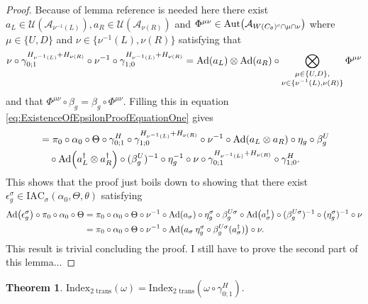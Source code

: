 \documentclass[12pt,a4paper,twoside]{article}
\newcommand{\IAC}{\textrm{IAC}}
\let\originalleft\left
\let\originalright\right
\renewcommand{\left}{\mathopen{}\mathclose\bgroup\originalleft}
\renewcommand{\right}{\aftergroup\egroup\originalright}
\newcommand{\UU}{\mathcal U}
\renewcommand{\AA}{\mathcal A}
\newcommand{\Ad}[1]{\textrm{Ad}\left(#1\right)}
\newcommand{\Aut}[1]{\textrm{Aut}\left(#1\right)}
\theoremstyle{definition}
\newtheorem{theorem}{Theorem}[section]
\numberwithin{equation}{section}
\begin{document}
\begin{proof}
	Because of lemma {\color{red}reference is needed here} there exist $a_L\in\UU(\AA_{\nu^{-1}(L)}),a_R\in\UU(\AA_{\nu(R)})$ and $\Phi^{\mu\nu}\in\Aut{\AA_{W(C_\theta)^c\cap\mu\cap\nu}}$ where $\mu\in\{U,D\}$ and $\nu\in\{\nu^{-1}(L),\nu(R)\}$ satisfying that
	\begin{equation}
		\nu\circ\gamma^{H_{\nu^{-1}(L)}+H_{\nu(R)}}_{0;1}\circ\nu^{-1}\circ\gamma^{H_{\nu^{-1}(L)}+H_{\nu(R)}}_{1;0}=\Ad{a_L}\otimes\Ad{a_R}\circ\bigotimes_{\substack{\mu\in\{U,D\},\\\nu\in\{\nu^{-1}(L),\nu(R)\}}}\Phi^{\mu\nu}
	\end{equation}
	and that $\Phi^{\mu\nu}\circ\beta_g=\beta_g\circ\Phi^{\mu\nu}$. Filling this in equation \eqref{eq:ExistenceOfEpsilonProofEquationOne} gives
	\begin{align}
		&=\pi_0\circ\alpha_0\circ\Theta\circ\gamma^H_{0;1}\circ\gamma^{H_{\nu^{-1}(L)}+H_{\nu(R)}}_{1;0}\circ\nu^{-1}\circ\Ad{a_L\otimes a_R}\circ\eta_g\circ\beta_g^U\\
		\nonumber
		&\quad \circ\Ad{a_L^\dagger\otimes a_R^\dagger}\circ(\beta_g^U)^{-1}\circ\eta_g^{-1}\circ\nu\circ\gamma^{H_{\nu^{-1}(L)}+H_{\nu(R)}}_{0;1}\circ\gamma^H_{1;0}.
	\end{align}
	This shows that the proof just boils down to showing that there exist $\epsilon_g^\sigma\in\IAC_\sigma(\alpha_0,\Theta,\theta)$ satisfying
	\begin{align}
		\Ad{\epsilon_g^\sigma}\circ\pi_0\circ\alpha_0\circ\Theta&=\pi_0\circ\alpha_0\circ\Theta\circ\nu^{-1}\circ\Ad{a_\sigma}\circ\eta_g^\sigma\circ\beta_g^{U\sigma}\circ\Ad{ a_\sigma^\dagger}\circ(\beta_g^{U\sigma})^{-1}\circ(\eta_g^\sigma)^{-1}\circ\nu\\
		&=\pi_0\circ\alpha_0\circ\Theta\circ\nu^{-1}\circ\Ad{a_\sigma\:\eta_g^\sigma\circ\beta_g^{U\sigma}(a_\sigma^\dagger)}\circ\nu.
	\end{align}
	This result is trivial concluding the proof. {\color{red}I still have to prove the second part of this lemma...}
\end{proof}
\begin{theorem}
	$\textrm{Index}_{\text{2 trans}}(\omega)=\textrm{Index}_{\text{2 trans}}(\omega\circ\gamma^H_{0;1}).$
\end{theorem}
\end{document}
